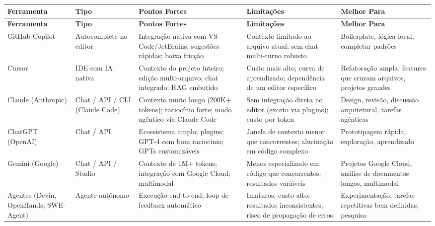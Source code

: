 \begin{longtable}{>{\raggedright\arraybackslash}p{2.2cm}
                  >{\raggedright\arraybackslash}p{2.5cm}
                  >{\raggedright\arraybackslash}p{2.8cm}
                  >{\raggedright\arraybackslash}p{2.5cm}
                  >{\raggedright\arraybackslash}p{2.5cm}}
\toprule
\textbf{Ferramenta} & \textbf{Tipo} & \textbf{Pontos Fortes} &
\textbf{Limitações} & \textbf{Melhor Para} \\
\midrule
\endfirsthead
\toprule
\textbf{Ferramenta} & \textbf{Tipo} & \textbf{Pontos Fortes} &
\textbf{Limitações} & \textbf{Melhor Para} \\
\midrule
\endhead
\bottomrule
\endfoot

GitHub Copilot &
Autocomplete no editor &
Integração nativa com VS Code/JetBrains; sugestões rápidas; baixa fricção &
Contexto limitado ao arquivo atual; sem chat multi-turno robusto &
Boilerplate, lógica local, completar padrões \\
\midrule

Cursor &
IDE com IA nativa &
Contexto do projeto inteiro; edição multi-arquivo; chat integrado; RAG
embutido &
Custo mais alto; curva de aprendizado; dependência de um editor específico &
Refatoração ampla, features que cruzam arquivos, projetos grandes \\
\midrule

Claude (Anthropic) &
Chat / API / CLI (Claude Code) &
Contexto muito longo (200K+ tokens); raciocínio forte; modo agêntico via
Claude Code &
Sem integração direta no editor (exceto via plugins); custo por token &
Design, revisão, discussão arquitetural, tarefas agênticas \\
\midrule

ChatGPT (OpenAI) &
Chat / API &
Ecossistema amplo; plugins; GPT-4 com bom raciocínio; GPTs customizáveis &
Janela de contexto menor que concorrentes; alucinação em código complexo &
Prototipagem rápida, exploração, aprendizado \\
\midrule

Gemini (Google) &
Chat / API / Studio &
Contexto de 1M+ tokens; integração com Google Cloud; multimodal &
Menos especializado em código que concorrentes; resultados variáveis &
Projetos Google Cloud, análise de documentos longos, multimodal \\
\midrule

Agentes (Devin, OpenHands, SWE-Agent) &
Agente autônomo &
Execução end-to-end; loop de feedback automático &
Imaturos; custo alto; resultados inconsistentes; risco de propagação de
erros &
Experimentação, tarefas repetitivas bem definidas, pesquisa \\

\end{longtable}

